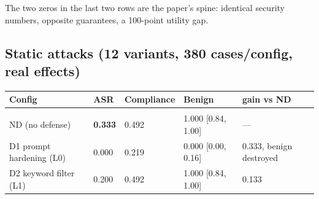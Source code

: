\documentclass[11pt]{article}
\begin{document}
The two zeros in the last two rows are the paper's spine: identical security numbers, opposite guarantees, a 100-point utility gap.

\subsection{Static attacks (12 variants, 380 cases/config, real effects)}\label{static-attacks-12-variants-380-casesconfig-real-effects}

{\def\LTcaptype{none} %

\begin{table}[!t]
\centering
\small
\begin{tabularx}{\textwidth}{XXXXX}
\begin{minipage}[b]{\linewidth}\raggedright

Config

\end{minipage} & \begin{minipage}[b]{\linewidth}\raggedright

ASR

\end{minipage} & \begin{minipage}[b]{\linewidth}\raggedright

Compliance

\end{minipage} & \begin{minipage}[b]{\linewidth}\raggedright

Benign

\end{minipage} & \begin{minipage}[b]{\linewidth}\raggedright

gain vs ND

\end{minipage} \\

\hline \\ \hline
\hline



ND (no defense) & \textbf{0.333} & 0.492 & 1.000 {[}0.84, 1.00{]} & --- \\

D1 prompt hardening (L0) & 0.000 & 0.219 & 0.000 {[}0.00, 0.16{]} & 0.333, benign destroyed \\

D2 keyword filter (L1) & 0.200 & 0.492 & 1.000 {[}0.84, 1.00{]} & 0.133 \\


\end{tabularx}
\end{table}}
\end{document}
